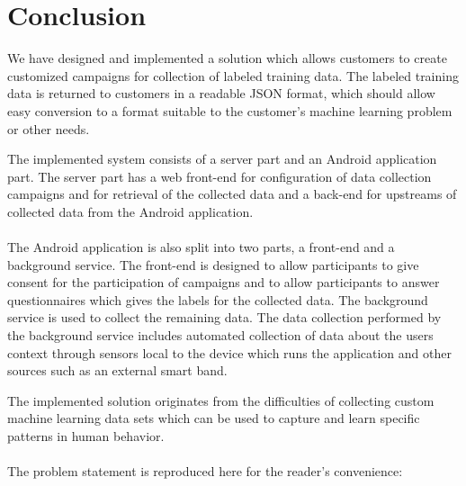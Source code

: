 
\chapter{Conclusion}
\label{cha:conclusion}

We have designed and implemented a solution which allows customers to create customized campaigns for collection of labeled training data. The labeled training data is returned to customers in a readable JSON format, which should allow easy conversion to a format suitable to the customer's machine learning problem or other needs. 

The implemented system consists of a server part and an Android application part. The server part has a web front-end for configuration of data collection campaigns and for retrieval of the collected data and a back-end for upstreams of collected data from the Android application. 
\\\\
The Android application is also split into two parts, a front-end and a background service. The front-end is designed to allow participants to give consent for the participation of campaigns and to allow participants to answer questionnaires which gives the labels for the collected data. The background service is used to collect the remaining data. The data collection performed by the background service includes automated collection of data about the users context through sensors local to the device which runs the application and other sources such as an external smart band. 


The implemented solution originates from the difficulties of collecting custom machine learning data sets which can be used to capture and learn specific patterns in human behavior.  
\\\\
The problem statement is reproduced here for the reader's convenience:




